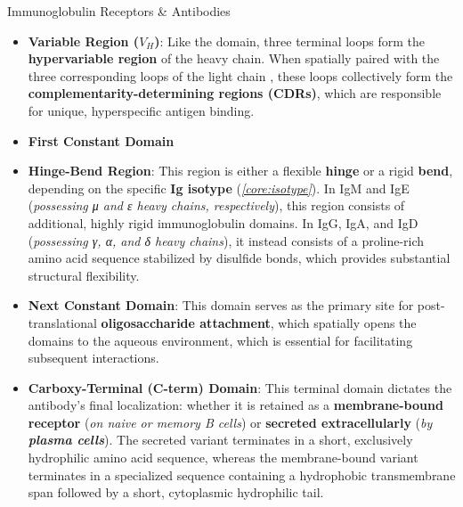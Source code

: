 \begin{core}[label=core:ig_receptor]{Immunoglobulin Receptors \& Antibodies}
\begin{enumerate}
          \begin{itemize}

            \item \textbf{Variable Region ($V_H$)}: Like the  domain, three terminal loops form the \textbf{hypervariable region} of the heavy chain. When spatially paired with the three corresponding loops of the light chain , these loops collectively form the \textbf{complementarity-determining regions (CDRs)}, which are responsible for unique, hyperspecific antigen binding.

            \item \textbf{First Constant Domain}

            \item \textbf{Hinge-Bend Region}: This region is either a flexible \textbf{hinge} or a rigid \textbf{bend}, depending on the specific \textbf{Ig isotype} (\textit{\autoref{core:isotype}}). In IgM and IgE (\textit{possessing μ and ε heavy chains, respectively}), this region consists of additional, highly rigid immunoglobulin domains. In IgG, IgA, and IgD (\textit{possessing γ, α, and δ heavy chains}), it instead consists of a proline-rich amino acid sequence stabilized by disulfide bonds, which provides substantial structural flexibility.

            \item \textbf{Next Constant Domain}: This domain serves as the primary site for post-translational \textbf{oligosaccharide attachment}, which spatially opens the domains to the aqueous environment, which is essential for facilitating subsequent interactions.

            \item \textbf{Carboxy-Terminal (C-term) Domain}: This terminal domain dictates the antibody's final localization: whether it is retained as a \textbf{membrane-bound receptor} (\textit{on naive or memory B cells}) or \textbf{secreted extracellularly} (\textit{by \textbf{plasma cells}}). The secreted variant terminates in a short, exclusively hydrophilic amino acid sequence, whereas the membrane-bound variant terminates in a specialized sequence containing a hydrophobic transmembrane span followed by a short, cytoplasmic hydrophilic tail.

          \end{itemize}

      \end{enumerate}

    \end{core}

